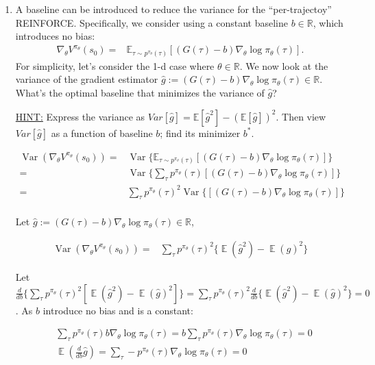 \documentclass[11pt]{article}
\theoremstyle{case}
\DeclareMathOperator{\E}{\mathbb{E}}
\DeclareMathOperator{\Var}{\text{Var}}
\begin{document}
\begin{enumerate}[label=(\alph*)]
    \item A baseline can be introduced to reduce the variance for the ``per-trajectoy'' REINFORCE. Specifically, we consider using a constant baseline $b\in\mathbb{R}$, which introduces no bias:
    \begin{align*}
        \nabla_\theta V^{\pi_\theta}(s_0) 
        =& \mathbb{E}_{\tau\sim p^{\pi_\theta}(\tau)} \left[ (G(\tau)-b ) \nabla_\theta \log\pi_\theta(\tau) \right].
    \end{align*}
    For simplicity, let's consider the 1-d case where $\theta \in \mathbb{R}$.
    We now look at the variance of the gradient estimator $\widehat{g}:=(G(\tau) - b) \nabla_\theta\log \pi_\theta(\tau) \in \mathbb{R}$.
    What's the optimal baseline that minimizes the variance of $\widehat{g}$?
    
    \underline{HINT:} Express the variance as $Var[\widehat{g}] = \mathbb{E}[\widehat{g}^2] - (\mathbb{E}[\widehat{g}])^2$. Then view $Var[\widehat{g}]$ as a function of baseline $b$; find its minimizer $b^*$. 
    \begin{shaded}
\begin{align*}
   \Var(\nabla_{\theta} V^{\pi_\theta}(s_0) ) = & \Var \{ \mathbb{E}_{\tau\sim p^{\pi_\theta}(\tau)} [ (G(\tau)-b) \nabla_{\theta} \log \pi_\theta (\tau)] \}\\
	= & \Var \{ \sum_\tau p^{\pi_\theta}(\tau) [ (G(\tau)-b) \nabla_{\theta} \log \pi_\theta (\tau)] \}\\
	= &  \sum_\tau p^{\pi_\theta}(\tau) ^2 \Var \{  [ (G(\tau)-b) \nabla_{\theta} \log \pi_\theta (\tau)] \} \\
\end{align*}

Let $\widehat{g}:=(G(\tau) - b) \nabla_\theta\log \pi_\theta(\tau) \in \mathbb{R}$,

\begin{align*}
   \Var(\nabla_{\theta} V^{\pi_\theta}(s_0) ) = & \sum_\tau p^{\pi_\theta}(\tau)^2 \{ \E (\hat{g}^2) - \E (\hat{g})^2 \}
\end{align*}

Let $\frac{d}{d b} \{\sum_\tau p^{\pi_\theta}(\tau)^2 [\E (\hat{g}^2) - \E (\hat{g})^2] \} =\sum_\tau p^{\pi_\theta}(\tau)^2 \frac{d}{d b} \{ \E ( \hat{g}^2) - \E (\hat{g})^2  \} = 0$. As $b$ introduce no bias and is a constant:

\begin{align*}
&\sum_\tau p^{\pi_\theta}(\tau) b \nabla_{\theta} \log \pi_\theta (\tau) = b \sum_\tau p^{\pi_\theta}(\tau) \nabla_{\theta} \log \pi_\theta (\tau) = 0\\
 & \E (\frac{d}{d b} \hat{g})  = \sum_\tau - p^{\pi_\theta}(\tau) \nabla_{\theta} \log \pi_\theta (\tau) = 0
\end{align*}


\end{shaded}
\end{enumerate}
\end{document}
